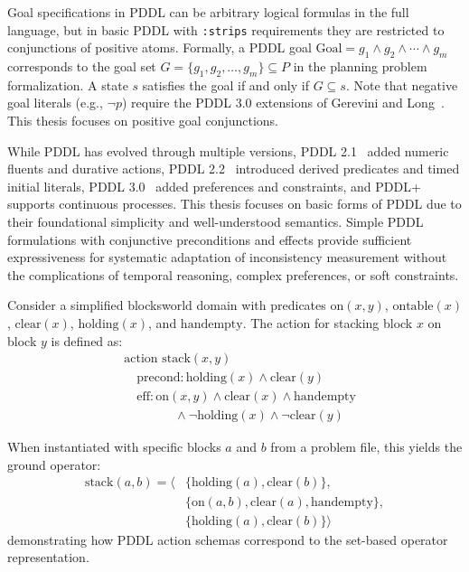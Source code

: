 Goal specifications in \ac{PDDL} can be arbitrary logical formulas in the full language, but in basic \ac{PDDL} with \texttt{:strips} requirements they are restricted to conjunctions of positive atoms. Formally, a \ac{PDDL} goal $\text{Goal} = g_1 \land g_2 \land \cdots \land g_m$ corresponds to the goal set $G = \{g_1, g_2, \ldots, g_m\} \subseteq P$ in the planning problem formalization. A state $s$ satisfies the goal if and only if $G \subseteq s$. Note that negative goal literals (e.g., $\neg p$) require the \ac{PDDL} 3.0 extensions of Gerevini and Long~\cite{Gerevini2005}. This thesis focuses on positive goal conjunctions.

While \ac{PDDL} has evolved through multiple versions, \ac{PDDL} 2.1~\cite{Fox2003} added numeric fluents and durative actions, \ac{PDDL} 2.2~\cite{Edelkamp2004} introduced derived predicates and timed initial literals, \ac{PDDL} 3.0~\cite{Gerevini2005} added preferences and constraints, and \ac{PDDL}+~\cite{Fox2002} supports continuous processes. This thesis focuses on basic forms of \ac{PDDL} due to their foundational simplicity and well-understood semantics. Simple \ac{PDDL} formulations with conjunctive preconditions and effects provide sufficient expressiveness for systematic adaptation of inconsistency measurement without the complications of temporal reasoning, complex preferences, or soft constraints.

\begin{example}
    \label{ex:blocksworld}
    Consider a simplified blocksworld domain with predicates $\text{on}(x,y)$, $\text{ontable}(x)$, $\text{clear}(x)$, $\text{holding}(x)$, and $\text{handempty}$. The action for stacking block $x$ on block $y$ is defined as:
    \begin{align*}
         & \text{action } \text{stack}(x, y)                                             \\
         & \quad \text{precond}: \text{holding}(x) \land \text{clear}(y)                 \\
         & \quad \text{eff}: \text{on}(x,y) \land \text{clear}(x) \land \text{handempty} \\
         & \qquad\qquad \land \neg\text{holding}(x) \land \neg\text{clear}(y)
    \end{align*}

    When instantiated with specific blocks $a$ and $b$ from a problem file, this yields the ground operator:
    \begin{align*}
        \text{stack}(a,b) = \langle & \{\text{holding}(a), \text{clear}(b)\},                \\
                                    & \{\text{on}(a,b), \text{clear}(a), \text{handempty}\}, \\
                                    & \{\text{holding}(a), \text{clear}(b)\} \rangle
    \end{align*}
    demonstrating how \ac{PDDL} action schemas correspond to the set-based operator representation.
\end{example}

